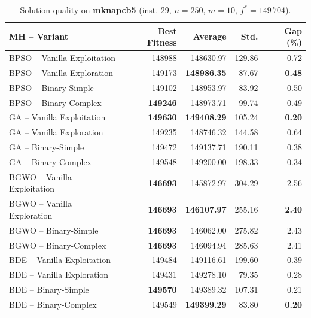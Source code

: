 \begin{table}[htbp]
  \centering
  \small
  \caption{Solution quality on \textbf{mknapcb5} (inst. 29, $n=250$, $m=10$, $f^*=149\,704$).}
  \label{tab:calidad_mknapcb5_29}
  \begin{tabular}{lrrrr}
    \toprule
    \textbf{MH -- Variant} &
    \textbf{Best Fitness} &
    \textbf{Average} &
    \textbf{Std.} &
    \textbf{Gap (\%)} \\
    \midrule
    BPSO -- Vanilla Exploitation &         148988 &        148630.97 & 129.86 &         0.72 \\
    BPSO -- Vanilla Exploration  &         149173 & \textbf{148986.35} &  87.67 & \textbf{0.48} \\
    BPSO -- Binary-Simple        &         149102 &        148953.97 &  83.92 &         0.50 \\
    BPSO -- Binary-Complex       & \textbf{149246} &        148973.71 &  99.74 &         0.49 \\
    \midrule
    GA -- Vanilla Exploitation   & \textbf{149630} & \textbf{149408.29} & 105.24 & \textbf{0.20} \\
    GA -- Vanilla Exploration    &         149235 &        148746.32 & 144.58 &         0.64 \\
    GA -- Binary-Simple          &         149472 &        149137.71 & 190.11 &         0.38 \\
    GA -- Binary-Complex         &         149548 &        149200.00 & 198.33 &         0.34 \\
    \midrule
    BGWO -- Vanilla Exploitation & \textbf{146693} &        145872.97 & 304.29 &         2.56 \\
    BGWO -- Vanilla Exploration  & \textbf{146693} & \textbf{146107.97} & 255.16 & \textbf{2.40} \\
    BGWO -- Binary-Simple        & \textbf{146693} &        146062.00 & 275.82 &         2.43 \\
    BGWO -- Binary-Complex       & \textbf{146693} &        146094.94 & 285.63 &         2.41 \\
    \midrule
    BDE -- Vanilla Exploitation  &         149484 &        149116.61 & 199.60 &         0.39 \\
    BDE -- Vanilla Exploration   &         149431 &        149278.10 &  79.35 &         0.28 \\
    BDE -- Binary-Simple         & \textbf{149570} &        149389.32 & 107.31 &         0.21 \\
    BDE -- Binary-Complex        &         149549 & \textbf{149399.29} &  83.80 & \textbf{0.20} \\
    \bottomrule
  \end{tabular}
\end{table}
